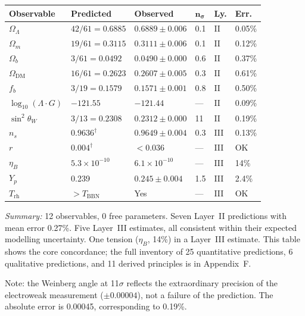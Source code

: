 \documentclass[11pt]{article}
\begin{document}
\smallskip
\begin{center}
\small
\begin{tabular}{p{2.2cm}p{3cm}p{2.5cm}p{0.6cm}p{0.5cm}p{1cm}}
\toprule
\textbf{Observable} & \textbf{Predicted} & \textbf{Observed} & $\boldsymbol{n_\sigma}$ & \textbf{Ly.} & \textbf{Err.} \\
\midrule
$\Omega_\Lambda$ & $42/61 = 0.6885$ & $0.6889 \pm 0.006$ & 0.1 & II & 0.05\% \\
$\Omega_m$ & $19/61 = 0.3115$ & $0.3111 \pm 0.006$ & 0.1 & II & 0.12\% \\
$\Omega_b$ & $3/61 = 0.0492$ & $0.0490 \pm 0.000$ & 0.6 & II & 0.37\% \\
$\Omega_{\mathrm{DM}}$ & $16/61 = 0.2623$ & $0.2607 \pm 0.005$ & 0.3 & II & 0.61\% \\
$f_b$ & $3/19 = 0.1579$ & $0.1571 \pm 0.001$ & 0.8 & II & 0.50\% \\
$\log_{10}(\Lambda\!\cdot\! G)$ & $-121.55$ & $-121.44$ & --- & II & 0.09\% \\
$\sin^2\!\theta_W$ & $3/13 = 0.2308$ & $0.2312 \pm 0.000$ & 11 & II & 0.19\% \\
$n_s$ & $0.9636^\dagger$ & $0.9649 \pm 0.004$ & 0.3 & III & 0.13\% \\
$r$ & $0.004^\dagger$ & ${<}0.036$ & --- & III & OK \\
$\eta_B$ & $5.3\!\times\!10^{-10}$ & $6.1\!\times\!10^{-10}$ & --- & III & 14\% \\
$Y_p$ & 0.239 & $0.245 \pm 0.004$ & 1.5 & III & 2.4\% \\
$T_{\mathrm{rh}}$ & ${>}T_{\mathrm{BBN}}$ & Yes & --- & III & OK \\
\bottomrule
\end{tabular}
\end{center}
\smallskip


\noindent\textit{Summary:} 12 observables, 0 free parameters.  Seven Layer~II predictions with mean error 0.27\%.  Five Layer~III estimates, all consistent within their expected modelling uncertainty.  One tension ($\eta_B$, 14\%) in a Layer~III estimate.  This table shows the core concordance; the full inventory of 25 quantitative predictions, 6 qualitative predictions, and 11 derived principles is in Appendix~F.

Note: the Weinberg angle at 11$\sigma$ reflects the extraordinary precision of the electroweak measurement ($\pm 0.00004$), not a failure of the prediction.  The absolute error is 0.00045, corresponding to 0.19\%.
\end{document}
